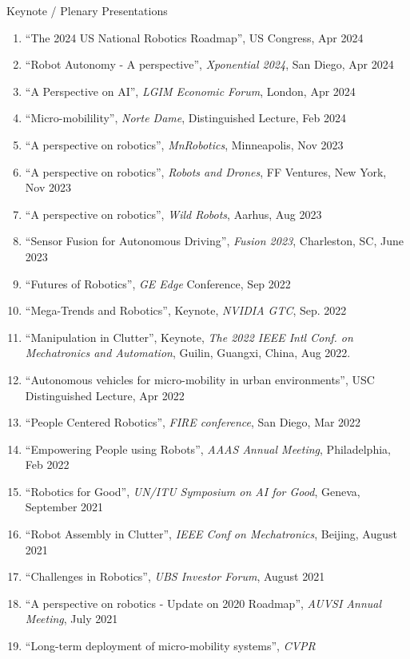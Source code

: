 \documentclass{article}
\begin{document}
\begin{cv}
\begin{cvlist}{Keynote / Plenary Presentations}
  \item
  \begin{enumerate}
  \item ``The 2024 US National Robotics Roadmap'', US Congress, Apr 2024
  \item ``Robot Autonomy - A perspective'', {\em Xponential 2024}, San Diego, Apr 2024
  \item ``A Perspective on AI'', {\em LGIM Economic Forum}, London, Apr 2024
  \item ``Micro-mobilility'', {\em Norte Dame}, Distinguished Lecture, Feb 2024    
  \item ``A perspective on robotics'', {\em MnRobotics}, Minneapolis, Nov 2023
  \item ``A perspective on robotics'', {\em Robots and Drones}, FF Ventures, New York, Nov 2023
  \item ``A perspective on robotics'', {\em Wild Robots}, Aarhus, Aug 2023
  \item ``Sensor Fusion for Autonomous Driving'', {\em Fusion 2023},
          Charleston, SC, June 2023
  \item ``Futures of Robotics'', {\em GE Edge} Conference, Sep 2022
  \item ``Mega-Trends and Robotics'', Keynote, {\em NVIDIA GTC}, Sep. 2022
  \item ``Manipulation in Clutter'', Keynote, {\em The 2022 IEEE Intl Conf. on
          Mechatronics and Automation}, Guilin, Guangxi, China, Aug 2022.
  \item ``Autonomous vehicles for micro-mobility in urban
    environments'',  USC Distinguished Lecture, Apr 2022
  \item ``People Centered Robotics'', {\em FIRE conference}, San Diego, Mar 2022
  \item ``Empowering People using Robots'', {\em AAAS Annual Meeting}, Philadelphia, Feb 2022
  \item ``Robotics for Good'', {\em UN/ITU Symposium on AI for Good}, Geneva, September 2021
  \item ``Robot Assembly in Clutter'', {\em IEEE Conf on Mechatronics}, Beijing, August 2021
  \item ``Challenges in Robotics'', {\em UBS Investor Forum}, August 2021
  \item ``A perspective on robotics - Update on 2020 Roadmap'', {\em  AUVSI Annual Meeting}, July 2021
  \item ``Long-term deployment of micro-mobility systems'', {\em CVPR
}
\end{enumerate}
\end{cvlist}
\end{cv}
\end{document}
